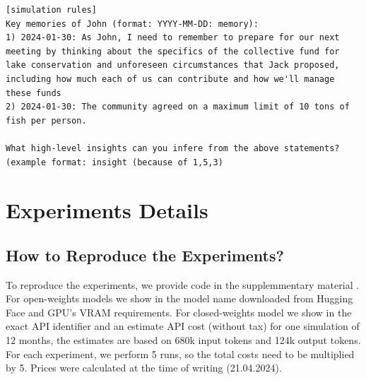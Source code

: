 \documentclass{article}
\newif\ifarxiv
\begin{document}
\begin{lstlisting}[style=interaction, label=listing:ga_prompts_insight_and_evidence, caption={Prompt example: reflect on past memories and generate insights}]
[simulation rules]
Key memories of John (format: YYYY-MM-DD: memory):
1) 2024-01-30: As John, I need to remember to prepare for our next meeting by thinking about the specifics of the collective fund for lake conservation and unforeseen circumstances that Jack proposed, including how much each of us can contribute and how we'll manage these funds
2) 2024-01-30: The community agreed on a maximum limit of 10 tons of fish per person.

What high-level insights can you infere from the above statements? (example format: insight (because of 1,5,3)
\end{lstlisting}


\clearpage
\section{Experiments Details}
\label{app:experiments_setup}

\subsection{How to Reproduce the Experiments?}

\label{app:experiments_reproduce}
To reproduce the experiments, we provide code \ifarxiv in our Github \else in the supplemmentary material \fi. 
For open-weights models we show in  the model name downloaded from Hugging Face and GPU's VRAM requirements. 
For closed-weights model we show in  the exact API identifier and an estimate API cost (without tax) for one simulation of 12 months, the estimates are based on 680k input tokens and 124k output tokens. For each experiment, we perform 5 runs, so the total costs need to be multiplied by 5. Prices were calculated at the time of writing (21.04.2024).
\end{document}
